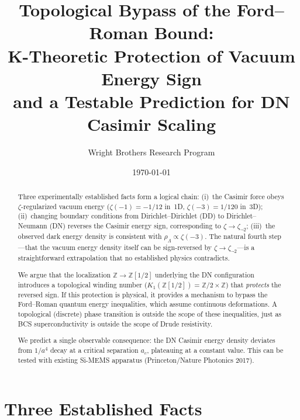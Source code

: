 \documentclass[aps,prl,twocolumn,superscriptaddress,nofootinbib]{revtex4-2}
\begin{document}
\title{Topological Bypass of the Ford--Roman Bound:\\
K-Theoretic Protection of Vacuum Energy Sign\\
and a Testable Prediction for DN Casimir Scaling}

\author{Wright Brothers Research Program}

\date{\today}

\begin{abstract}
Three experimentally established facts form a logical chain:
(i)~the Casimir force obeys $\zeta$-regularized vacuum energy
($\zeta(-1)=-1/12$ in~1D, $\zeta(-3)=1/120$ in~3D);
(ii)~changing boundary conditions from Dirichlet--Dirichlet (DD)
to Dirichlet--Neumann (DN) reverses the Casimir energy sign,
corresponding to $\zeta\to\zeta_{\neg 2}$;
(iii)~the observed dark energy density is consistent with
$\rho_\Lambda\propto\zeta(-3)$.  The natural fourth step---that
the vacuum energy density itself can be sign-reversed by
$\zeta\to\zeta_{\neg 2}$---is a straightforward extrapolation
that no established physics contradicts.

We argue that the localization $\mathbb{Z}\to\mathbb{Z}[1/2]$
underlying the DN configuration introduces a topological winding
number ($K_1(\mathbb{Z}[1/2])=\mathbb{Z}/2\times\mathbb{Z}$)
that \emph{protects} the reversed sign.  If this protection is
physical, it provides a mechanism to bypass the Ford--Roman quantum
energy inequalities, which assume continuous deformations.  A
topological (discrete) phase transition is outside the scope of
these inequalities, just as BCS superconductivity is outside the
scope of Drude resistivity.

We predict a single observable consequence: the DN Casimir energy
density deviates from $1/a^4$ decay at a critical separation $a_c$,
plateauing at a constant value.  This can be tested with existing
Si-MEMS apparatus (Princeton/Nature Photonics 2017).
\end{abstract}

\maketitle

\section{Three Established Facts}
\end{document}
